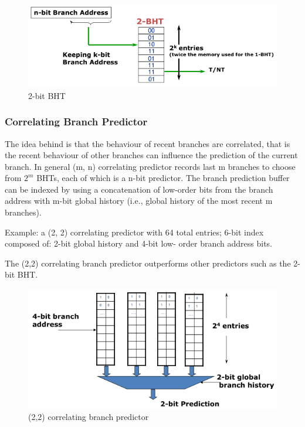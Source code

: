 \begin{figure}[h]
    \centering
    \includegraphics[scale = 0.3]{images/2-bit-BHT}
    \caption{2-bit BHT}
    \label{fig:2-bit-BHT}
\end{figure}


\subsubsection{Correlating Branch Predictor}
The idea behind is that the behaviour of recent branches are correlated, that is the recent behaviour of other
branches can influence the prediction of the current branch.
In general (m, n) correlating predictor records last m branches to choose from $2^m$ BHTs, each of which is a n-bit
predictor.
The branch prediction buffer can be indexed by
using a concatenation of low-order bits from the
branch address with m-bit global history (i.e.,
global history of the most recent m branches).

Example: a (2, 2) correlating predictor with 64 total entries;
6-bit index composed of: 2-bit global history and 4-bit low-
order branch address bits.

The (2,2) correlating branch predictor outperforms other predictors such as the 2-bit BHT\@.
\begin{figure}[H]
    \centering
    \includegraphics[scale = 0.4]{images/(2,2)-correlating-branch-predictor}
    \caption{(2,2) correlating branch predictor}
    \label{fig:(2,2)-correlating-branch-predictor}
\end{figure}

